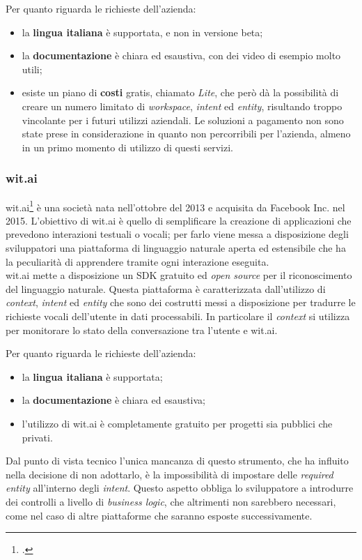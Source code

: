 Per quanto riguarda le richieste dell'azienda:
\begin{itemize}
	\item la \textbf{lingua italiana} è supportata, e non in versione beta;
	\item la \textbf{documentazione} è chiara ed esaustiva, con dei video di esempio molto utili;
	\item esiste un piano di \textbf{costi} gratis, chiamato \emph{Lite}, che però dà la possibilità di creare un numero limitato di \emph{workspace}, \emph{intent} ed \emph{entity}, risultando troppo vincolante per i futuri utilizzi aziendali. Le soluzioni a pagamento non sono state prese in considerazione in quanto non percorribili per l'azienda, almeno in un primo momento di utilizzo di questi servizi.
\end{itemize}

\subsubsection{wit.ai}
wit.ai\footcite{witai} è una società nata nell'ottobre del 2013 e acquisita da Facebook Inc. nel 2015.
L'obiettivo di wit.ai è quello di semplificare la creazione di applicazioni che prevedono interazioni testuali o vocali; per farlo viene messa a disposizione degli sviluppatori una piattaforma di linguaggio naturale aperta ed estensibile che ha la peculiarità di apprendere tramite ogni interazione eseguita.\\
wit.ai mette a disposizione un SDK gratuito ed \emph{open source} per il riconoscimento del linguaggio
naturale. Questa piattaforma è caratterizzata dall'utilizzo di \emph{context}, \emph{intent} ed \emph{entity} che sono
dei costrutti messi a disposizione per tradurre le richieste vocali dell'utente in dati processabili. In particolare il \emph{context} si utilizza per monitorare lo stato della conversazione tra l'utente e wit.ai.

Per quanto riguarda le richieste dell'azienda:
\begin{itemize}
	\item la \textbf{lingua italiana} è supportata;
	\item la \textbf{documentazione} è chiara ed esaustiva;
	\item l'utilizzo di wit.ai è completamente gratuito per progetti sia pubblici che privati.
\end{itemize}

Dal punto di vista tecnico l'unica mancanza di questo strumento, che ha influito nella decisione di non adottarlo, è la impossibilità di impostare delle \emph{required entity} all'interno degli \emph{intent}. Questo aspetto obbliga lo sviluppatore a introdurre dei controlli a livello di \emph{business logic}, che altrimenti non sarebbero necessari, come nel caso di altre piattaforme che saranno esposte successivamente.

